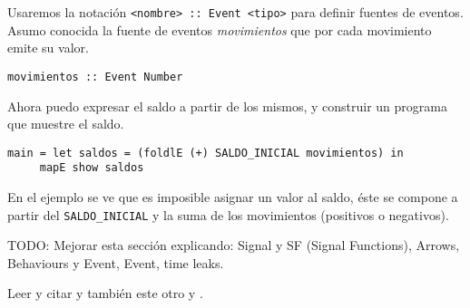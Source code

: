   Usaremos la notación \texttt{<nombre> :: Event <tipo>} para definir
fuentes de eventos.
  Asumo conocida la fuente de eventos \emph{movimientos} que por
cada movimiento
emite su valor.

\begin{verbatim}
movimientos :: Event Number
\end{verbatim}

  Ahora puedo expresar el saldo a partir de los mismos, y construir
un programa que muestre el saldo.

\begin{verbatim}
main = let saldos = (foldlE (+) SALDO_INICIAL movimientos) in
     mapE show saldos
\end{verbatim}

  En el ejemplo se ve que es imposible asignar un valor al saldo,
éste se compone a partir del \texttt{SALDO\_INICIAL} y la suma de
los movimientos (positivos o negativos).

TODO: Mejorar esta sección explicando: Signal y SF (Signal Functions),
Arrows, Behaviours y Event, Event, time leaks.

Leer y citar \cite{peterson99:lambdainmotion} y también este otro
\cite{evanczaplicki2012:Elm} y \cite{yampa}.
